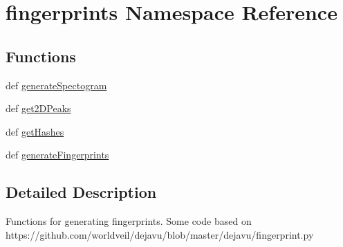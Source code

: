 \hypertarget{namespacefingerprints}{\section{fingerprints Namespace Reference}
\label{namespacefingerprints}
}
\subsection*{Functions}
\begin{DoxyCompactItemize}
\item 
def \hyperlink{namespacefingerprints_ad16038d9952756d6531d72b1a511fd2c}{generate\-Spectogram}
\item 
def \hyperlink{namespacefingerprints_ae528f9d6259d39b1d78621381a8ff75a}{get2\-D\-Peaks}
\item 
def \hyperlink{namespacefingerprints_a3559a67b49b4453274c518de642fcf63}{get\-Hashes}
\item 
def \hyperlink{namespacefingerprints_ab6735baad314e024cbe01d42ff5d5c2a}{generate\-Fingerprints}
\end{DoxyCompactItemize}


\subsection{Detailed Description}
\begin{DoxyVerb}    Functions for generating fingerprints.
    Some code based on https://github.com/worldveil/dejavu/blob/master/dejavu/fingerprint.py
\end{DoxyVerb}
 

